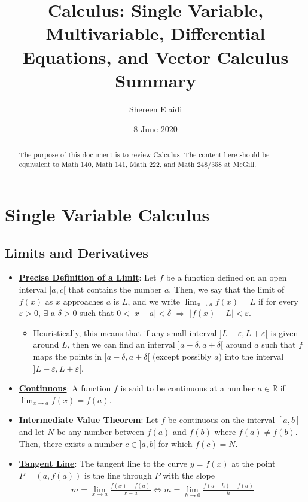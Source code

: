 \documentclass[reqno,11pt]{amsart}
\title{Calculus: Single Variable, Multivariable, Differential Equations, and Vector Calculus Summary}
\author{Shereen Elaidi}
\date{8 June 2020}
\theoremstyle{definition}
\theoremstyle{remark}
\newcommand{\R}{\mathbb{R}}
\newcommand{\dfn}[1]{\underline{\textbf{#1}}}
\begin{document}
\maketitle 
\begin{abstract}
	The purpose of this document is to review Calculus. The content here should be equivalent to Math 140, Math 141, Math 222, and Math 248/358 at McGill. 
\end{abstract}
\tableofcontents
\section{Single Variable Calculus}
\subsection{Limits and Derivatives}
\begin{itemize}[noitemsep]
	\item \dfn{Precise Definition of a Limit}: Let $f$ be a function defined on an open interval $]a,c[$ that contains the number $a$. Then, we say that the limit of $f(x)$ as $x$ approaches $a$ is $L$, and we write $\lim_{x \rightarrow a} f(x) = L$ if for every $\varepsilon > 0$, $\exists$ a $\delta > 0$ such that $0 < | x - a | < \delta$ $\Rightarrow$ $|f(x) - L| < \varepsilon$.
	\begin{itemize}[noitemsep]	
		\item Heuristically, this means that if any small interval $] L - \varepsilon, L +  \varepsilon [$ is given around $L$, then we can find an interval $]a - \delta, a + \delta [$ around $a$ such that $f$ maps the points in $]a - \delta, a + \delta [$ (except possibly $a$) into the interval $] L - \varepsilon, L+ \varepsilon[$. 
	\end{itemize}
	\item \dfn{Continuous}: A function $f$ is said to be continuous at a number $ a \in \R$ if $\lim_{x \rightarrow a} f(x) = f(a)$. 
	\item \dfn{Intermediate Value Theorem}: Let $f$ be continuous on the interval $[a,b]$ and let $N$ be any number between $f(a)$ and $f(b)$ where $f(a) \neq f(b)$. Then, there exists a number $c \in ]a,b[$ for which $f(c) = N$. 
	\item \dfn{Tangent Line}: The tangent line to the curve $y = f(x)$ at the point $P = (a, f(a))$ is the line through $P$ with the slope 
	\begin{align}
		m = \lim_{x \rightarrow a} \frac{f(x) - f(a)}{x - a} \iff m = \lim_{h \rightarrow 0} \frac{f(a+h) - f(a)}{h}	

\end{align}
\end{itemize}
\end{document}
